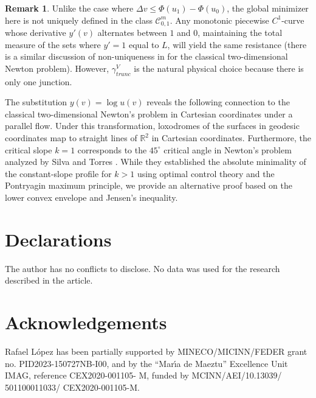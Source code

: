 \documentclass[a4paper,12pt]{amsart}
\theoremstyle{definition}
\newtheorem{remark}[theorem]{Remark}
\def\r{\mathbb R}
\begin{document}
\begin{remark}
Unlike the case where $\Delta v \le \Phi(u_1) - \Phi(u_0)$, the global minimizer here is not uniquely defined in the class $\mathcal{C}_{0,1}^m$.   Any monotonic piecewise $C^1$-curve whose derivative $y'(v)$ alternates between $1$ and $0$, maintaining the total measure of the sets where $y'=1$ equal to $L$, will yield the same  resistance (there is a similar discussion of non-uniqueness in \cite{st} for the classical two-dimensional Newton problem). However, $\gamma_{trunc}^V$ is the natural physical choice because there is only one junction.
\end{remark}

 
The substitution $y(v) = \log u(v)$ reveals the following connection to  the classical two-dimensional Newton's problem in Cartesian coordinates under a parallel flow.    Under this transformation, loxodromes of the surfaces in geodesic coordinates map   to straight lines of $\r^2$ in  Cartesian coordinates. Furthermore, the critical slope   $k=1$   corresponds to  the   $45^\circ$ critical angle in Newton's problem  analyzed by Silva and Torres \cite{st}. While they established the absolute minimality of the constant-slope profile for $k > 1$ using optimal control theory and the Pontryagin maximum principle, we provide an alternative   proof based on the lower convex envelope and Jensen's inequality.  

\section*{Declarations }

The author has no conflicts to disclose. No data was used for the research described in the article.
 


 \section*{Acknowledgements}
Rafael L\'opez has been partially supported by MINECO/MICINN/FEDER grant no. PID2023-150727NB-I00, and by the ``Mar\'{\i}a de Maeztu'' Excellence Unit IMAG, reference CEX2020-001105- M, funded by MCINN/AEI/10.13039/ 501100011033/ CEX2020-001105-M.
\end{document}

